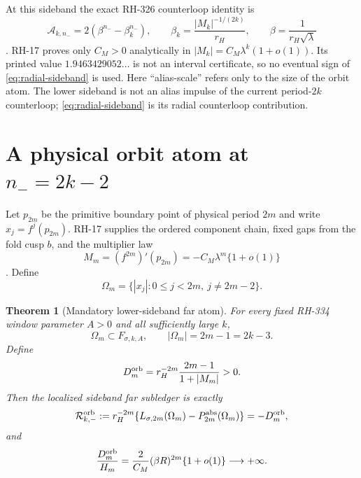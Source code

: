 \documentclass[11pt]{article}
\newtheorem{theorem}{Theorem}[section]
\theoremstyle{remark}
\newcommand{\cA}{\mathcal A}
\newcommand{\cR}{\mathcal R}
\begin{document}
At this sideband the exact RH-326 counterloop identity is
\begin{equation}\label{eq:radial-sideband}
 \cA_{k,n_-}=2(\beta^{n_-}-\beta_k^{n_-}),
 \qquad
 \beta_k=\frac{|M_k|^{-1/(2k)}}{r_H},
 \qquad
 \beta=\frac1{r_H\sqrt\lambda}
\end{equation}
\citep{WangFirstAlias2026}.  RH-17 proves only $C_M>0$ analytically in
$|M_k|=C_M\lambda^k(1+o(1))$.  Its printed value
$1.9463429052\ldots$ is not an interval certificate, so no eventual sign of
\eqref{eq:radial-sideband} is used.  Here ``alias-scale'' refers only to the
size of the orbit atom.  The lower sideband is not an alias impulse of the
current period-$2k$ counterloop; \eqref{eq:radial-sideband} is its radial
counterloop contribution.

\section{A physical orbit atom at $n_-=2k-2$}

Let $p_{2m}$ be the primitive boundary point of physical period $2m$ and
write $x_j=f^j(p_{2m})$.  RH-17 supplies the ordered component chain, fixed
gaps from the fold cusp $b$, and the multiplier law
\begin{equation}\label{eq:M-m}
 M_m=(f^{2m})'(p_{2m})=-C_M\lambda^m\{1+o(1)\}
\end{equation}
\citep{WangBoundaryMonodromy2026}.  Define
\begin{equation}\label{eq:Omega-m}
 \Omega_m=\{|x_j|:0\le j<2m,\ j\ne2m-2\}.
\end{equation}

\begin{theorem}[Mandatory lower-sideband far atom]
\label{thm:sideband-atom}
For every fixed RH-334 window parameter $A>0$ and all sufficiently large
$k$,
\begin{equation}\label{eq:Omega-sideband-F}
 \Omega_m\subset F_{\sigma,k,A},
 \qquad |\Omega_m|=2m-1=2k-3.
\end{equation}
Define
\begin{equation}\label{eq:D-m}
 D_m^{\rm orb}
 =r_H^{-2m}\frac{2m-1}{1+|M_m|}>0.
\end{equation}
Then the localized sideband far subledger is exactly
\begin{equation}\label{eq:R-orb-minus}
 \cR_{k,-}^{\rm orb}
 :=r_H^{-2m}\{L_{\sigma,2m}(\Omega_m)
              -P_{2m}^{\rm abs}(\Omega_m)\}
 =-D_m^{\rm orb},
\end{equation}
and
\begin{equation}\label{eq:D-Hm}
 \frac{D_m^{\rm orb}}{H_m}
 =\frac{2}{C_M}(\beta R)^{2m}\{1+o(1)\}
 \longrightarrow+\infty.
\end{equation}
\end{theorem}
\end{document}
